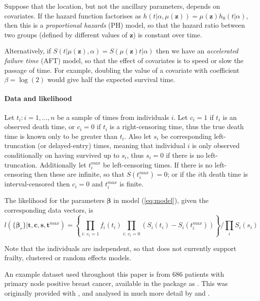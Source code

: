 \documentclass[nojss,nofooter]{jss}
\begin{document}

Suppose that the location, but not the ancillary parameters, depends
on covariates.  If the hazard function factorises as $h(t | \alpha,
\mu(\mathbf{z})) = \mu(\mathbf{z}) h_0(t | \alpha)$, then this is a
\emph{proportional hazards} (PH) model, so that the hazard ratio between
two groups (defined by different values of $\mathbf{z}$) is constant
over time.

Alternatively, if $S(t | \mu(\mathbf{z}), \alpha) =
S(\mu(\mathbf{z}) t | \alpha)$ then we have an \emph{accelerated
  failure time} (AFT) model, so that the effect of covariates is to speed or
slow the passage of time. For example, doubling the value of a
covariate with coefficient $\beta=\log(2)$ would give half the
expected survival time.


\paragraph{Data and likelihood} 

Let $t_i: i=1,\ldots, n$ be a sample of times from individuals $i$.
Let $c_i=1$ if $t_i$ is an observed death time, or $c_i=0$ if $t_i$ is
a right-censoring time, thus the true death time is known only to be
greater than $t_i$.  Also let $s_i$ be corresponding left-truncation
(or delayed-entry) times, meaning that individual $i$ is only observed
conditionally on having survived up to $s_i$, thus $s_i=0$ if there is
no left-truncation.  Additionally let $t^{max}_i$ be left-censoring
times.  If there is no left-censoring then these are infinite, so that
$S(t^{max}_i)=0$; or if the $i$th death time is interval-censored then
$c_i=0$ and $t^{max}_i$ is finite.

The likelihood for the parameters $\bm{\beta}$ in model
(\ref{eq:model}), given the corresponding data vectors, is
\begin{equation}
  \label{eq:lik}
  l(\{\bm{\beta}_r\} | \mathbf{t},\mathbf{c},\mathbf{s},\mathbf{t}^{max}) = \left\{ \prod_{i:\ c_i=1} f_i(t_i) \prod_{i:\ c_i=0} \left(S_i(t_i) - S_i(t^{max}_i)\right)\right\} / \prod_i S_i(s_i)  
\end{equation}

Note that the individuals are independent, so that  does not
currently support frailty, clustered or random effects models.

An example dataset used throughout this paper is from 686 patients
with primary node positive breast cancer, available in the package as
. This was originally provided with  \citep{stpm:orig},
and analysed in much more detail by \citet{royston:parmar} and
\citet{sauerbrei1999building}.
\end{document}
